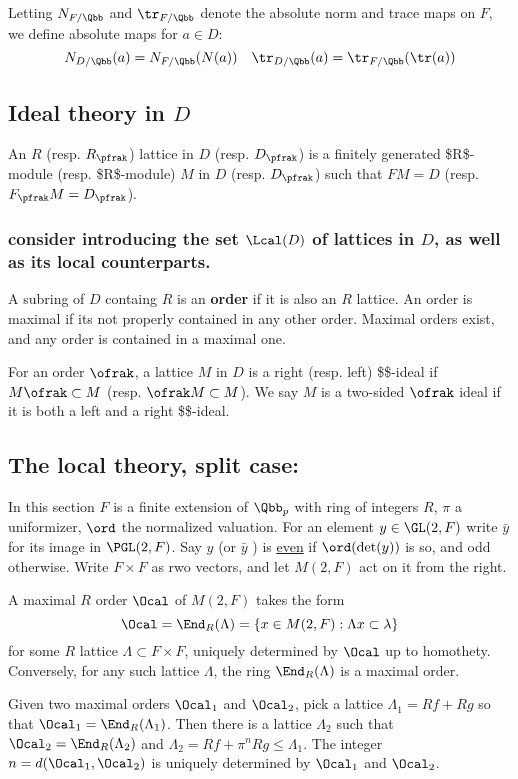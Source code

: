 \documentclass[11pt]{article}
\begin{document}
Letting \(N_{F/\Qbb}\) and \(\tr_{F/\Qbb}\) denote the absolute norm and trace maps on \(F\), we define absolute maps for \(a \in D\):
\[ N_{D/\Qbb} (a) = N_{F/\Qbb} (N(a)) \quad \tr_{D/\Qbb} (a) = \tr_{F/\Qbb} (\tr (a)) \] 
\subsection{Ideal theory in \(D\)}
\label{sec:orgec6b45e}
An \(R\) (resp. \(R_\pfrak\)) lattice in \(D\) (resp. \(D_\pfrak\)) is a finitely generated \$R\$-module (resp. \$R\textsubscript{\pfrak}\$-module) \(M\) in \(D\) (resp. \(D_\pfrak\)) such that \(FM = D\) (resp. \(F_\pfrak M = D_\pfrak\)).
\subsubsection{consider introducing the set \(\Lcal(D)\) of lattices in \(D\), as well as its local counterparts.}
\label{sec:org7ff204b}
A subring of \(D\) containg \(R\) is an \textbf{order} if it is also an \(R\) lattice.  An order is maximal if its not properly contained in any other order.   Maximal orders exist, and any order is contained in a maximal one.

For an order \(\ofrak\), a lattice \(M\) in \(D\) is a right (resp. left) \$\ofrak\$-ideal  if \(M \ofrak \subset M\) (resp. \(\ofrak M \subset M\)). We say \(M\) is a two-sided \(\ofrak\) ideal if it is both a left and a right \$\ofrak\$-ideal.

\subsection{The local theory, split case:}
\label{sec:org7edff72}
In this section \(F\) is a finite extension of \(\Qbb_p\) with ring of integers \(R\),  \(\pi\) a uniformizer, \(\ord\) the normalized valuation. For an element \(y \in \GL(2,F)\) write \(\bar{y}\) for its image in \(\PGL(2,F)\). Say \(y\) (or \(\bar{y}\) ) is \uline{even} if \(\ord(\det(y))\) is so, and odd otherwise. Write \(F \times F\) as rwo vectors, and let \(M(2,F)\) act on it from the right.

A maximal \(R\) order \(\Ocal\) of \(M(2,F)\) takes the form
\[ \Ocal = \End_R(\Lambda) = \{ x \in M(2,F) : \Lambda x \subset \lambda \} \]
for some \(R\) lattice \(\Lambda \subset F \times F\), uniquely determined by \(\Ocal\) up to homothety. Conversely, for any such lattice \(\Lambda\), the ring \(\End_R(\Lambda)\) is a maximal order.


Given two maximal orders \(\Ocal_1\) and \(\Ocal_2\), pick a lattice \(\Lambda_1 =  Rf +Rg\) so that \(\Ocal_1 = \End_R(\Lambda_1)\). Then there is a lattice \(\Lambda_2\) such that \(\Ocal_2 = \End_R(\Lambda_2)\) and \(\Lambda_2 = R f + \pi^n R g  \leq \Lambda_1\). The integer \(n=d(\Ocal_1,\Ocal_2)\) is uniquely determined by \(\Ocal_1\) and \(\Ocal_2\). 
\end{document}
